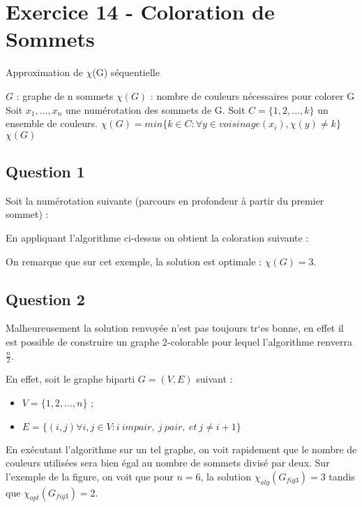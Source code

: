 
\section{Exercice 14 - Coloration de Sommets}\label{ex14}

\begin{center}
\begin{algorithm}[H]
\caption{Approximation de $\chi$(G) s\'equentielle}\label{ex14_algo}
\begin{algorithmic}[1]
\REQUIRE $G$ : graphe de n sommets
\ENSURE $\chi(G)$ : nombre de couleurs n\'ecessaires pour colorer G
\STATE Soit $x_1,...,x_n$ une num\'erotation des sommets de G.
\STATE Soit $C = \{1,2,...,k\}$ un ensemble de couleurs.
	\STATE $\chi(G) = min\{k \in C : \forall y \in voisinage(x_i), \chi(y) \neq k\}$
\ENDFOR
\RETURN $\chi(G)$
\end{algorithmic}
\end{algorithm}
\end{center}

\subsection{Question 1}\label{ex14_q1}
Soit la num\'erotation suivante (parcours en profondeur \`a partir du premier sommet) :


En appliquant l'algorithme ci-dessus on obtient la coloration suivante :

On remarque que sur cet exemple, la solution est optimale : $\chi(G) = 3$.

\subsection{Question 2}\label{ex14_q2}
Malheureusement la solution renvoy\'ee n'est pas toujours tr`es bonne, en effet il est
possible de construire un graphe 2-colorable pour lequel l'algorithme renverra
$\frac{n}{2}$.

En effet, soit le graphe biparti $G = (V,E)$ suivant :\\
\begin{itemize}
	\item $V = \{1,2,...,n\}$ ;
	\item $E = \{(i,j) \forall i,j \in V : i\ impair,\ j\ pair,\ et\ j \neq i+1\}$
\end{itemize}



En ex\'ecutant l'algorithme sur un tel graphe, on voit rapidement que le nombre de
couleurs utilis\'ees sera bien \'egal au nombre de sommets divis\'e par deux.
Sur l'exemple de la figure, on voit que pour $n = 6$, la solution $\chi_{alg}(G_{fig3}) =
3$ tandis que $\chi_{opt}(G_{fig3}) = 2$.



